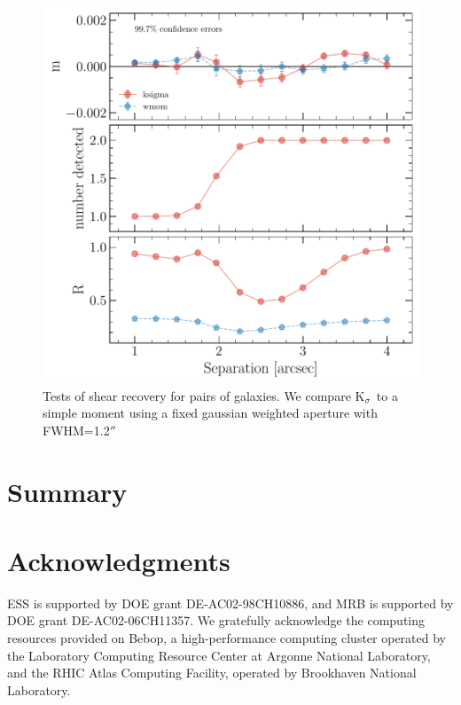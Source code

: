 \documentclass[twocolappendix, appendixfloats, numberedappendix, twocolumn, apj]{openjournal}
\newcommand{\ksigma}{\mbox{\boldmath $\mathrm{K}_{\sigma}$}\xspace}
\begin{document}
\begin{figure}
    \includegraphics[width=\columnwidth]{figures/pair-plot.pdf}
    \caption{
        Tests of shear recovery for pairs of galaxies.  We compare
        \ksigma\ to a simple moment using a fixed gaussian
        weighted aperture with FWHM=1.2$''$
    }
\end{figure}

\section{Summary}\label{sec:conc}


\section*{Acknowledgments}

ESS is supported by DOE grant DE-AC02-98CH10886, and MRB is supported by DOE
grant DE-AC02-06CH11357.  We gratefully acknowledge the computing resources
provided on Bebop, a high-performance computing cluster operated by the
Laboratory Computing Resource Center at Argonne National Laboratory, and the
RHIC Atlas Computing Facility, operated by Brookhaven National Laboratory.




\end{document}
